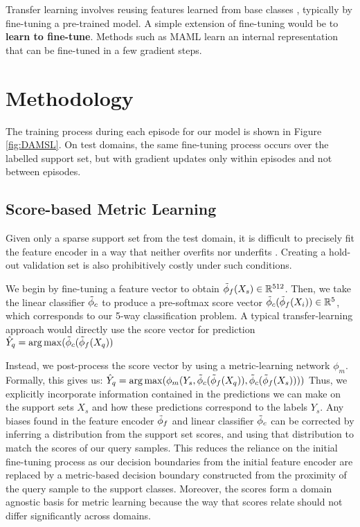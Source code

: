 \documentclass[final]{cvpr}
\DeclareMathOperator*{\argmax}{arg\,max}
\begin{document}
Transfer learning involves reusing features learned from base classes \cite{pan2009survey}, typically by fine-tuning a pre-trained model. A simple extension of fine-tuning would be to \textbf{learn to fine-tune}. Methods such as MAML \cite{finn2017model} learn an internal representation that can be fine-tuned in a few gradient steps. 





\section{Methodology}

The training process during each episode for our model is shown in Figure \ref{fig:DAMSL}. On test domains, the same fine-tuning process occurs over the labelled support set, but with gradient updates only within episodes and not between episodes.

\subsection{Score-based Metric Learning}

Given only a sparse support set from the test domain, it is difficult to precisely fit the feature encoder in a way that neither overfits nor underfits \cite{nakamura2019revisiting}. Creating a hold-out validation set is also prohibitively costly under such conditions.  

We begin by fine-tuning a feature vector to obtain \(\Tilde{\phi}_f (X_s) \in \mathbb{R}^{512}\). Then, we take the linear classifier \(\Tilde{\phi}_c \) to produce a pre-softmax score vector \(\Tilde{\phi}_c (\Tilde{\phi}_f (X_i)) \in \mathbb{R}^5\), which corresponds to our 5-way classification problem. A typical transfer-learning approach would directly use the score vector for prediction \(\hat{Y}_q = \argmax  (\Tilde{\phi}_c (\Tilde{\phi}_f (X_q))  \)

Instead, we post-process the score vector by using a metric-learning network \(\phi_m\). Formally, this gives us: \(\hat{Y}_q = \argmax (\phi_m (Y_s, \Tilde{\phi}_c (\Tilde{\phi}_f (X_q)), \Tilde{\phi}_c (\Tilde{\phi}_f (X_s))))\) Thus, we explicitly incorporate information contained in the predictions we can make on the support sets \(X_s\) and how these predictions correspond to the labels \(Y_s\). Any biases found in the feature encoder \(\Tilde{\phi}_f \) and linear classifier \(\Tilde{\phi}_c\)  can be corrected by inferring a distribution from the support set scores, and using that distribution to match the scores of our query samples. This reduces the reliance on the initial fine-tuning process as our decision boundaries from the initial feature encoder are replaced by a metric-based decision boundary constructed from the proximity of the query sample to the support classes. Moreover, the scores form a domain agnostic basis for metric learning because the way that scores relate should not differ significantly across domains.
\end{document}
